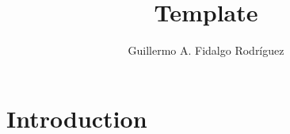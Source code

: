 \documentclass[aspectratio=43]{beamer}
\title{Template}
\author[G. Fidalgo]{Guillermo A. Fidalgo Rodríguez}
\institute[UA]{University of Alabama}
\begin{document}
\maketitle

\section{Introduction}
\end{document}

